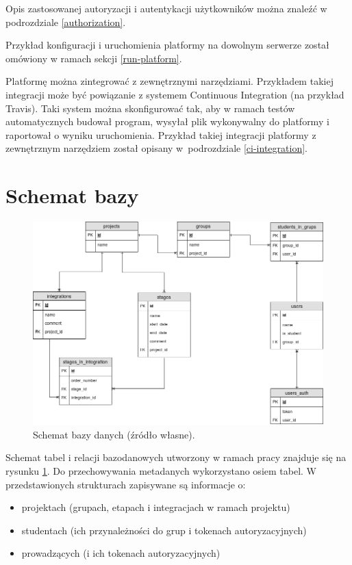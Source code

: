 Opis zastosowanej autoryzacji i autentykacji użytkowników można znaleźć w podrozdziale \ref{authorization}.

Przykład konfiguracji i uruchomienia platformy na dowolnym serwerze został omówiony w ramach sekcji \ref{run-platform}.

Platformę można zintegrować z zewnętrznymi narzędziami.
Przykładem takiej integracji może być powiązanie z systemem Continuous Integration (na przykład Travis).
Taki system można skonfigurować tak, aby w ramach testów automatycznych budował program, wysyłał plik wykonywalny do platformy i raportował o wyniku uruchomienia.
Przykład takiej integracji platformy z zewnętrznym narzędziem został opisany w~podrozdziale \ref{ci-integration}.

\section{Schemat bazy}
\label{database}

\begin{figure}[h]
    \centering
    \includegraphics[width = 13cm]{chapter05/db_schema.png}
    \caption{Schemat bazy danych (źródło własne).}
    \label{fig:platform-db-schema}
\end{figure}

Schemat tabel i relacji bazodanowych utworzony w ramach pracy znajduje się na rysunku \ref{fig:platform-db-schema}.
Do przechowywania metadanych wykorzystano osiem tabel.
W przedstawionych strukturach zapisywane są informacje o:
\begin{itemize}
    \item projektach (grupach, etapach i integracjach w ramach projektu)
    \item studentach (ich przynależności do grup i tokenach autoryzacyjnych)
    \item prowadzących (i ich tokenach autoryzacyjnych)
\end{itemize}

